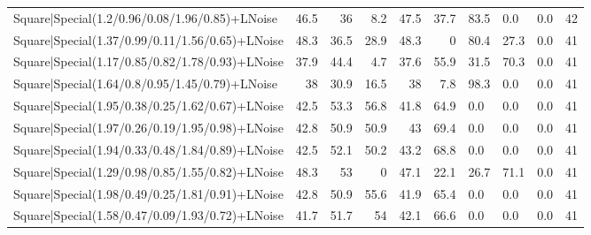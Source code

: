 \begin{tabular}{lrrrrrlllr}
 Square|Special(1.2/0.96/0.08/1.96/0.85)+LNoise                  &            46.5 &            36   &             8.2 &            47.5 &           37.7 & 83.5            & 0.0            & 0.0            &           42 \\
 Square|Special(1.37/0.99/0.11/1.56/0.65)+LNoise                 &            48.3 &            36.5 &            28.9 &            48.3 &            0   & 80.4            & 27.3           & 0.0            &           41 \\
 Square|Special(1.17/0.85/0.82/1.78/0.93)+LNoise                 &            37.9 &            44.4 &             4.7 &            37.6 &           55.9 & 31.5            & 70.3           & 0.0            &           41 \\
 Square|Special(1.64/0.8/0.95/1.45/0.79)+LNoise                  &            38   &            30.9 &            16.5 &            38   &            7.8 & 98.3            & 0.0            & 0.0            &           41 \\
 Square|Special(1.95/0.38/0.25/1.62/0.67)+LNoise                 &            42.5 &            53.3 &            56.8 &            41.8 &           64.9 & 0.0             & 0.0            & 0.0            &           41 \\
 Square|Special(1.97/0.26/0.19/1.95/0.98)+LNoise                 &            42.8 &            50.9 &            50.9 &            43   &           69.4 & 0.0             & 0.0            & 0.0            &           41 \\
 Square|Special(1.94/0.33/0.48/1.84/0.89)+LNoise                 &            42.5 &            52.1 &            50.2 &            43.2 &           68.8 & 0.0             & 0.0            & 0.0            &           41 \\
 Square|Special(1.29/0.98/0.85/1.55/0.82)+LNoise                 &            48.3 &            53   &             0   &            47.1 &           22.1 & 26.7            & 71.1           & 0.0            &           41 \\
 Square|Special(1.98/0.49/0.25/1.81/0.91)+LNoise                 &            42.8 &            50.9 &            55.6 &            41.9 &           65.4 & 0.0             & 0.0            & 0.0            &           41 \\
 Square|Special(1.58/0.47/0.09/1.93/0.72)+LNoise                 &            41.7 &            51.7 &            54   &            42.1 &           66.6 & 0.0             & 0.0            & 0.0            &           41 \\

\end{tabular}
